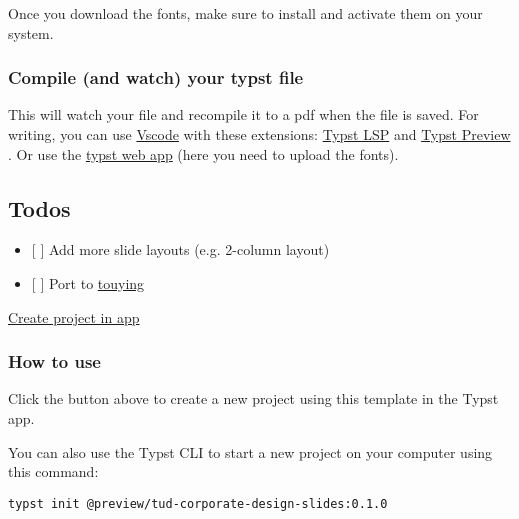 Once you download the fonts, make sure to install and activate them on
your system.

\subsubsection{Compile (and watch) your typst
file}\label{compile-and-watch-your-typst-file}

\begin{Shaded}
\begin{Highlighting}[]
\end{Highlighting}
\end{Shaded}

This will watch your file and recompile it to a pdf when the file is
saved. For writing, you can use
\href{https://code.visualstudio.com/}{Vscode} with these extensions:
\href{https://marketplace.visualstudio.com/items?itemName=nvarner.typst-lsp}{Typst
LSP} and
\href{https://marketplace.visualstudio.com/items?itemName=mgt19937.typst-preview}{Typst
Preview} . Or use the \href{https://typst.app/}{typst web app} (here you
need to upload the fonts).

\subsection{Todos}\label{todos}

\begin{itemize}
\tightlist
\item
  {[} {]} Add more slide layouts (e.g. 2-column layout)
\item
  {[} {]} Port to \href{https://github.com/touying-typ/touying}{touying}
\end{itemize}

\href{/app?template=tud-corporate-design-slides&version=0.1.0}{Create
project in app}

\subsubsection{How to use}\label{how-to-use}

Click the button above to create a new project using this template in
the Typst app.

You can also use the Typst CLI to start a new project on your computer
using this command:

\begin{verbatim}
typst init @preview/tud-corporate-design-slides:0.1.0
\end{verbatim}

